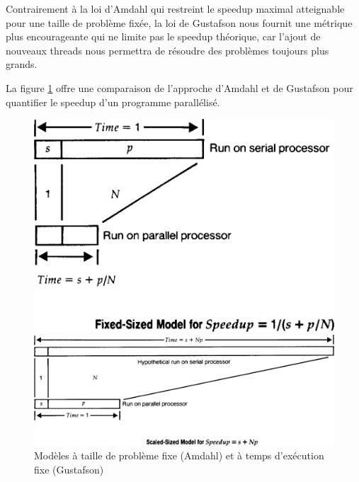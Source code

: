 \documentclass[a4paper, 10pt, twoside]{article}
\begin{document}
Contrairement à la loi d'Amdahl qui restreint le speedup maximal atteignable pour une taille de problème fixée, la loi de Gustafson nous fournit une métrique plus encourageante qui ne limite pas le speedup théorique, car l'ajout de nouveaux threads nous permettra de résoudre des problèmes toujours plus grands.

La figure \ref{fig:speedup-models} offre une comparaison de l'approche d'Amdahl et de Gustafson pour quantifier le speedup d'un programme parallélisé.

\begin{figure}[htb]
	\centering
	\begin{minipage}{0.33\textwidth}
		\centering
		\includegraphics[width=\textwidth]{img/amdahl_speedup_model.png}
	\end{minipage}
	\begin{minipage}{0.65\textwidth}
		\centering
		\includegraphics[width=\textwidth]{img/gustafson_speedup_model.png}
	\end{minipage}
	\caption{Modèles à taille de problème fixe (Amdahl) et à temps d'exécution fixe (Gustafson)}
	\label{fig:speedup-models}
\end{figure}
\end{document}
